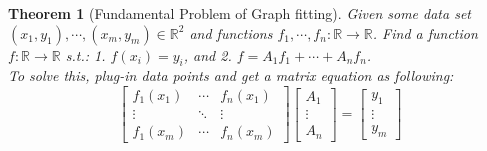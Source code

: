 \documentclass[12pt, a4paper]{article}
\newtheorem{thm}{Theorem}[subsection]
\def\R{{\mathbb{R}}}
\begin{document}
\begin{thm}[Fundamental Problem of Graph fitting]
	Given some data set $(x_1,y_1),\cdots,(x_m,y_m)\in\R^2$ and functions $f_1,\cdots,f_n: \R\to\R$. Find a function $f:\R\to\R$ \emph{s.t.}: 1. $f(x_i)=y_i$, and 2. $f=A_1f_1+\cdots+A_nf_n$.\\
	To solve this, plug-in data points and get a matrix equation as following: 
	\[\begin{bmatrix}f_1(x_1)&\cdots&f_n(x_1)\\\vdots&\ddots&\vdots\\f_1(x_m)&\cdots&f_n(x_m)\end{bmatrix}\begin{bmatrix}A_1\\\vdots\\A_n\end{bmatrix}=\begin{bmatrix}y_1\\\vdots\\y_m\end{bmatrix}\]	
\end{thm}
\end{document}
